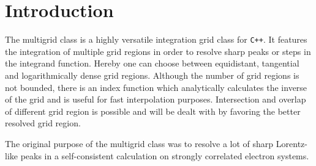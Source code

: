 \chapter{Introduction}

The multigrid class is a highly versatile integration grid class for \texttt{C++}. It features the integration of multiple grid regions in order to resolve sharp peaks or steps in the integrand function. Hereby one can choose between equidistant, tangential and logarithmically dense grid regions. Although the number of grid regions is not bounded, there is an index function which analytically calculates the inverse of the grid and is useful for fast interpolation purposes. Intersection and overlap of different grid region is possible and will be dealt with by favoring the better resolved grid region.

The original purpose of the multigrid class was to resolve a lot of sharp Lorentz-like peaks in a self-consistent calculation on strongly correlated electron systems.

